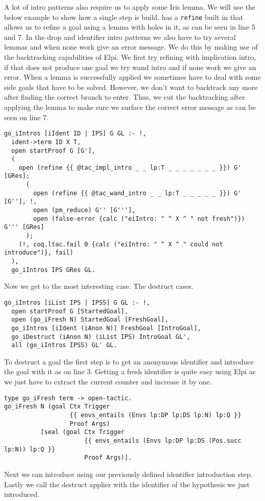 \documentclass[thesis.tex]{subfiles}
\begin{document}
A lot of intro patterns also require us to apply some Iris lemma. We will use the below example to show how a single step is build. \ce has a \texttt{refine} built in that allows us to refine a goal using a lemma with holes in it, as can be seen in line 5 and 7. In the drop and identifier intro patterns we also have to try several lemmas and when none work give an error message. We do this by making use of the backtracking capabilities of Elpi. We first try refining with implication intro, if that does not produce one goal we try wand intro and if none work we give an error. When a lemma is successfully applied we sometimes have to deal with some side goals that have to be solved. However, we don't want to backtrack any more after finding the correct branch to enter. Thus, we cut the backtracking after applying the lemma to make sure we surface the correct error message as can be seen on line 7.
\begin{verbatim}
go_iIntros [iIdent ID | IPS] G GL :- !,
  ident->term ID X T,
  open startProof G [G'],
  (
    open (refine {{ @tac_impl_intro _ _ lp:T _ _ _ _ _ _ _ }}) G' [GRes];
      (
        open (refine {{ @tac_wand_intro _ _ lp:T _ _ _ _ _ }}) G' [G''], !,
        open (pm_reduce) G'' [G'''],
        open (false-error {calc ("eiIntro: " ^ X ^ " not fresh")}) G''' [GRes]
      );
    (!, coq.ltac.fail 0 {calc ("eiIntro: " ^ X ^ " could not introduce")}, fail)
  ),
  go_iIntros IPS GRes GL.
\end{verbatim}

Now we get to the most interesting case. The destruct cases.
\begin{verbatim}
go_iIntros [iList IPS | IPSS] G GL :- !,
  open startProof G [StartedGoal],
  open (go_iFresh N) StartedGoal [FreshGoal],
  go_iIntros [iIdent (iAnon N)] FreshGoal [IntroGoal],
  go_iDestruct (iAnon N) (iList IPS) IntroGoal GL',
  all (go_iIntros IPSS) GL' GL.
\end{verbatim}
To destruct a goal the first step is to get an anonymous identifier and introduce the goal with it as on line 3. Getting a fresh identifier is quite easy using Elpi as we just have to extract the current counter and increase it by one.
\begin{verbatim}
type go_iFresh term -> open-tactic.
go_iFresh N (goal Ctx Trigger 
                  {{ envs_entails (Envs lp:DP lp:DS lp:N) lp:Q }} 
                  Proof Args) 
          [seal (goal Ctx Trigger 
                      {{ envs_entails (Envs lp:DP lp:DS (Pos.succ lp:N)) lp:Q }} 
                      Proof Args)].
\end{verbatim}
Next we can introduce using our previously defined identifier introduction step. Lastly we call the destruct applier with the identifier of the hypothesis we just introduced.
\end{document}
